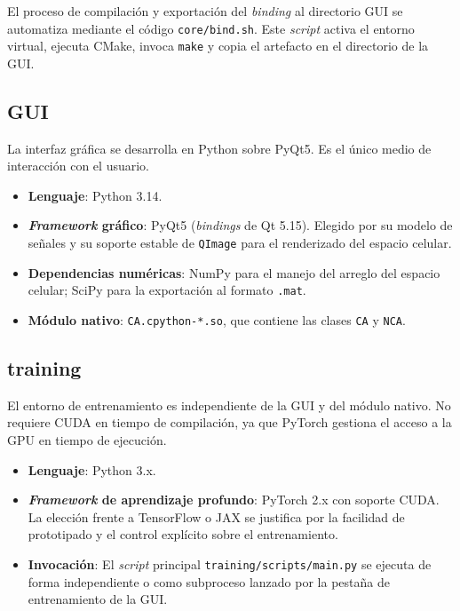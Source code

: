 El proceso de compilación y exportación del \textit{binding} al directorio GUI se automatiza mediante el código \texttt{core/bind.sh}. Este \textit{script} activa el entorno virtual, ejecuta CMake, invoca \texttt{make} y copia el artefacto en el directorio de la GUI.

\subsection{GUI}

La interfaz gráfica se desarrolla en Python sobre PyQt5. Es el único medio de interacción con el usuario. 

\begin{itemize}
    \item \textbf{Lenguaje}: Python 3.14.
    \item \textbf{\textit{Framework} gráfico}: PyQt5 (\textit{bindings} de Qt 5.15). Elegido por su modelo de señales y su soporte estable de \texttt{QImage} para el renderizado del espacio celular.
    \item \textbf{Dependencias numéricas}: NumPy para el manejo del arreglo del espacio celular; SciPy para la exportación al formato \texttt{.mat}.
    \item \textbf{Módulo nativo}: \texttt{CA.cpython-*.so}, que contiene las clases \texttt{CA} y \texttt{NCA}.
\end{itemize}

\subsection{training}

El entorno de entrenamiento es independiente de la GUI y del módulo nativo. No requiere CUDA en tiempo de compilación, ya que PyTorch gestiona el acceso a la GPU en tiempo de ejecución.

\begin{itemize}
    \item \textbf{Lenguaje}: Python 3.x.
    \item \textbf{\textit{Framework} de aprendizaje profundo}: PyTorch 2.x con soporte CUDA. La elección frente a TensorFlow o JAX se justifica por la facilidad de prototipado y el control explícito sobre el entrenamiento.
    \item \textbf{Invocación}: El \textit{script} principal \texttt{training/scripts/main.py} se ejecuta de forma independiente o como subproceso lanzado por la pestaña de entrenamiento de la GUI.
\end{itemize}
